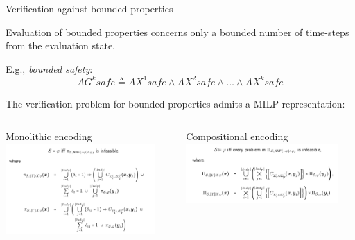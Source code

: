 \documentclass[10pt]{beamer}
\begin{document}
\begin{frame}{ Verification against bounded properties}


	Evaluation of \alert{bounded properties} concerns only a bounded number of
	time-steps from the evaluation state.

	E.g., \emph{bounded safety}: \[AG^k \mathit{safe} \triangleq
	AX^1\mathit{safe} \land AX^2 \mathit{safe} \land \dots \land AX^k
\mathit{safe}\]

  The verification problem for bounded properties admits a \alert{
  MILP representation}:
  \begin{columns}
   \begin{column}{0.5\textwidth}
	   \begin{block}{Monolithic encoding}
  	\centering
	\includegraphics[width=0.9\textwidth]{enc.png}
  \end{block}
  \end{column}
   \begin{column}{0.5\textwidth}
	   \begin{block}{Compositional encoding}
  	\centering
	\includegraphics[width=0.9\textwidth]{enc2.png}
  \end{block}
  \end{column}
  \end{columns}

\end{frame}
\end{document}
